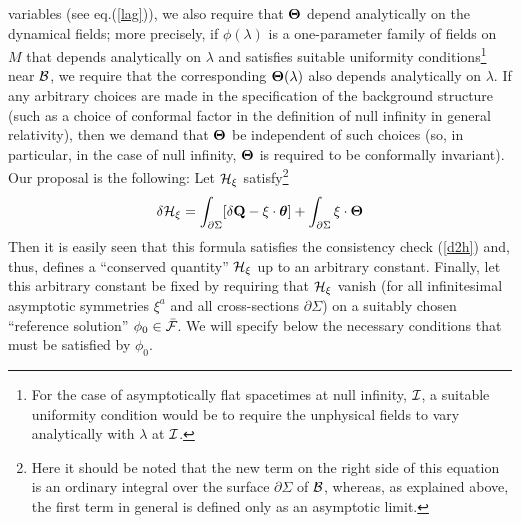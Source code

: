variables (see eq.(\ref{lag})), we also require that ${\mbox{\boldmath
$\Theta$}}$ depend analytically on the dynamical fields; more
precisely, if $\phi(\lambda)$ is a one-parameter family of fields on
$M$ that depends analytically on $\lambda$ and satisfies suitable
uniformity conditions\footnote{For the case of asymptotically flat
spacetimes at null infinity, $\cal I$, a suitable uniformity condition
would be to require the unphysical fields to vary analytically with
$\lambda$ at $\cal I$.} near $\cal B$, we require that the
corresponding ${\mbox{\boldmath $\Theta$}}(\lambda)$ also depends
analytically on $\lambda$. If any arbitrary choices are made in the
specification of the background structure (such as a choice of
conformal factor in the definition of null infinity in general
relativity), then we demand that ${\mbox{\boldmath $\Theta$}}$ be
independent of such choices (so, in particular, in the case of null
infinity, ${\mbox{\boldmath $\Theta$}}$ is required to be conformally
invariant). Our proposal is the following: Let ${\cal H}_\xi$
satisfy\footnote{Here
it should be noted that the new term on the right side of this
equation is an ordinary integral over the surface $\partial \Sigma$ of
${\cal B}$, whereas, as explained above, the first term in general is
defined only as an asymptotic limit.}
\begin{equation}
\delta {\cal H}_\xi = \int_{\partial \Sigma} [\delta {\bf Q} - \xi \cdot
{\mbox{\boldmath $\theta$}}] + \int_{\partial \Sigma} \xi \cdot
{\mbox{\boldmath $\Theta$}}
\label{hsurf2}
\end{equation}
Then it is easily seen that this formula satisfies the consistency
check (\ref{d2h}) and, thus, defines a ``conserved quantity'' ${\cal
H}_\xi$ up to an arbitrary constant.  Finally, let this arbitrary
constant be fixed by requiring that ${\cal H}_\xi$ vanish (for all
infinitesimal asymptotic symmetries $\xi^a$ and all cross-sections
$\partial \Sigma$) on a suitably chosen ``reference solution'' $\phi_0
\in \bar{\cal F}$. We will specify below the necessary conditions that
must be satisfied by $\phi_0$.

